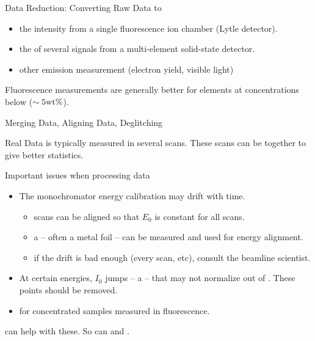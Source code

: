 \begin{slide}{Data Reduction: Converting Raw Data to  {\mue}  }
\begin{cenpage}{145mm}
{{ \begin{itemize}
 \item  the intensity from a single fluorescence ion chamber (Lytle detector).
 \item  the {} of several signals from a multi-element solid-state detector.
 \item  other emission measurement (electron yield, visible light)
 \end{itemize}

 \vmm
  
 
 Fluorescence measurements are generally better for
 elements at concentrations below  ($\sim 5 {\rm wt  \%}$).

}}

  \vfill
  
\end{cenpage}
\end{slide}

\begin{slide}{Merging Data, Aligning Data, Deglitching }

Real Data is typically measured in several scans.  These scans can be
{} together to give better statistics.

\vmm
Important issues when processing data

\begin{cenpage}{120mm}
\begin{itemize}
\item The monochromator energy calibration may drift with time.
  \begin{itemize}
    \item scans can be aligned so that $E_0$ is constant for all scans.
    \item a {} -- often a metal foil -- can be
      measured {} and used for energy alignment.
    \item if the drift is bad enough (every scan, etc), consult the
      beamline scientist.
  \end{itemize}
\item At certain energies, $I_0$ jumps -- a {} -- that may
  not normalize out of {\mue}.  These points should be removed.
\item {} for concentrated samples measured in
  fluorescence.
  \end{itemize}
\end{cenpage}

{\xasviewer}  can help with these. So can {\athena} and {\sixpack}.



\end{slide}

